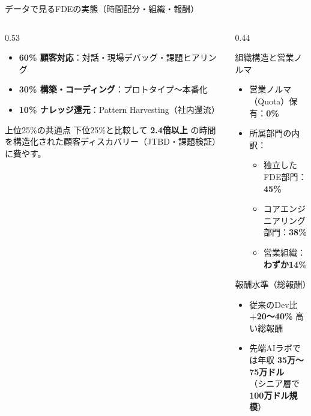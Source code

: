 \documentclass[aspectratio=169,11pt]{beamer}
\begin{document}
\begin{frame}{データで見るFDEの実態（時間配分・組織・報酬）}
\begin{columns}[T]
\begin{column}{0.53\textwidth}
      \vspace{0.2em}
      {\scriptsize
      \begin{itemize}
        \item \textbf{60\% 顧客対応}：対話・現場デバッグ・課題ヒアリング
        \item \textbf{30\% 構築・コーディング}：プロトタイプ〜本番化
        \item \textbf{10\% ナレッジ還元}：Pattern Harvesting（社内還流）
      \end{itemize}
      }
      \vspace{0.2em}
      \begin{alertblock}{上位25\%の共通点}
        \scriptsize
        下位25\%と比較して \textbf{2.4倍以上} の時間を構造化された顧客ディスカバリー（JTBD・課題検証）に費やす。
      \end{alertblock}
    \end{column}
    \begin{column}{0.44\textwidth}
      \begin{block}{組織構造と営業ノルマ}
        \scriptsize
        \begin{itemize}
          \item 営業ノルマ（Quota）保有：\textbf{0\%}
          \item 所属部門の内訳：
            \begin{itemize}\scriptsize
              \item 独立したFDE部門：\textbf{45\%}
              \item コアエンジニアリング部門：\textbf{38\%}
              \item 営業組織：\textbf{わずか14\%}
            \end{itemize}
        \end{itemize}
      \end{block}
      \vspace{0.2em}
      \begin{exampleblock}{報酬水準（総報酬）}
        \scriptsize
        \begin{itemize}
          \item 従来のDev比 \textbf{+20〜40\%} 高い総報酬
          \item 先端AIラボでは年収 \textbf{35万〜75万ドル}\\
            （シニア層で \textbf{100万ドル規模}）
        \end{itemize}
      \end{exampleblock}
    \end{column}
  \end{columns}
\end{frame}
\end{document}
